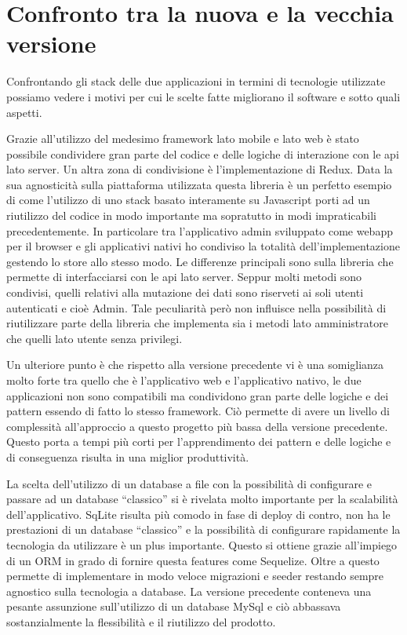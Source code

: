 \section{Confronto tra la nuova e la vecchia versione}\vspace{5mm}
Confrontando gli stack delle due applicazioni in termini di tecnologie utilizzate possiamo vedere i motivi per cui le scelte fatte migliorano il software e sotto quali aspetti. \vspace{5mm}

Grazie all'utilizzo del medesimo framework lato mobile e lato web è stato possibile condividere gran parte del codice e delle logiche di interazione con le api lato server. Un altra zona di condivisione è l'implementazione di Redux. Data la sua agnosticità sulla piattaforma utilizzata questa libreria è un perfetto esempio di come l'utilizzo di uno stack basato interamente su Javascript porti ad un riutilizzo del codice in modo importante ma sopratutto in modi impraticabili precedentemente. In particolare tra l’applicativo admin sviluppato come webapp per il browser e gli applicativi nativi ho condiviso la totalità dell’implementazione gestendo lo store allo stesso modo. Le differenze principali sono sulla libreria che permette di interfacciarsi con le api lato server. Seppur molti metodi sono condivisi, quelli relativi alla mutazione dei dati sono riserveti ai soli utenti autenticati e cioè Admin. Tale peculiarità però non influisce nella possibilità di riutilizzare parte della libreria che implementa sia i metodi lato amministratore che quelli lato utente senza privilegi.\vspace{5mm} 

Un ulteriore punto è che rispetto alla versione precedente vi è una somiglianza molto forte tra quello che è l’applicativo web e l’applicativo nativo, le due applicazioni non sono compatibili ma condividono gran parte delle logiche e dei pattern essendo di fatto lo stesso framework. Ciò permette di avere un livello di complessità all'approccio a questo progetto più bassa della versione precedente. Questo porta a tempi più corti per l'apprendimento dei pattern e delle logiche e di conseguenza risulta in una miglior produttività.\vspace{5mm}
	
La scelta dell’utilizzo di un database a file con la possibilità di configurare e passare ad un database “classico” si è rivelata molto importante per la scalabilità dell’applicativo. SqLite risulta più comodo in fase di deploy di contro, non ha le prestazioni di un database “classico” e la possibilità di configurare rapidamente la tecnologia da utilizzare è un plus importante. Questo si ottiene grazie all’impiego di un ORM in grado di fornire questa features come Sequelize. Oltre a questo permette di implementare in modo veloce migrazioni e seeder restando sempre agnostico sulla tecnologia a database. La versione precedente conteneva una pesante assunzione sull’utilizzo di un database MySql e ciò abbassava sostanzialmente la flessibilità e il riutilizzo del prodotto.\vspace{5mm}

